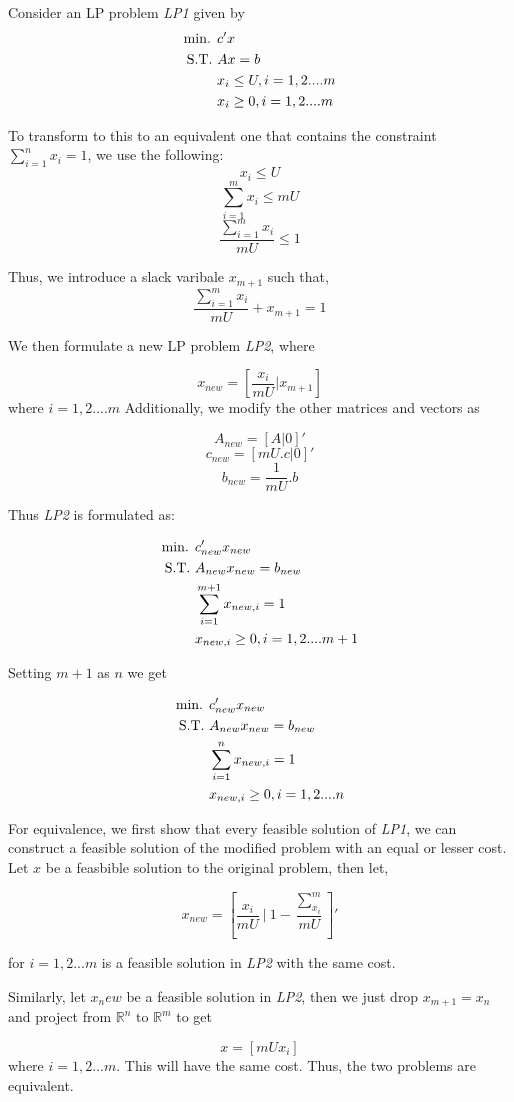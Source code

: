 Consider an LP problem \textit{LP1} given by
\begin{align}
    \text{min. } &c'x \notag\\
    \text{S.T. } &Ax = b \notag\\
    &x_i \le U, i = 1,2....m \notag\\
    &x_i \ge 0, i = 1,2....m \notag\\
\end{align}

To transform to this to an equivalent one that contains the constraint $\sum_{i=1}^{n}x_i = 1$, we use the following: 
\[ x_i \le U\]
\[ \sum_{i=1}^{m}x_i \le mU \]
\[ \frac{\sum_{i=1}^{m}x_i}{mU} \le 1\]

Thus, we introduce a slack varibale $x_{m+1}$ such that, 
\[ \frac{\sum_{i=1}^{m}x_i}{mU} + x_{m+1} = 1\]

We then formulate a new LP problem \textit{LP2}, where

\[ x_{new} = [\frac{x_i}{mU} | x_{m+1}]\]
where $i=1,2....m$
Additionally, we modify the other matrices and vectors as 

\[ A_{new} = [A | 0]'\]
\[ c_{new} = [mU.c | 0]'\]
\[ b_{new} = \frac{1}{mU}.b\]

Thus \textit{LP2} is formulated as:


\begin{align}
    \text{min. } &c_{new}'x_{new} \notag\\
    \text{S.T. } &A_{new}x_{new} = b_{new} \notag\\
    &\sum_{i=1}^{m+1}x_{new,i} = 1 \notag \\
    &x_{new,i} \ge 0, i = 1,2....m+1 \notag\\
\end{align}

Setting $m+1$ as $n$ we get

\begin{align}
    \text{min. } &c_{new}'x_{new} \notag\\
    \text{S.T. } &A_{new}x_{new} = b_{new} \notag\\
    &\sum_{i=1}^{n}x_{new,i} = 1 \notag \\
    &x_{new,i} \ge 0, i = 1,2....n \notag\\
\end{align}


For equivalence, we first show that every feasible solution of \textit{LP1}, we can construct a feasible solution of the modified problem with an equal or lesser cost. \\

Let $x$ be a feasbible solution to the original problem, then let,

\[x_{new} = \left[\frac{x_i}{mU} \:|\: 1 - \frac{\sum_{x_i}^{m}}{mU}\right]'\]

for $i=1,2...m$ is a feasible solution in \textit{LP2} with the same cost.

Similarly, let $x_new$ be a feasible solution in \textit{LP2}, then we just drop $x_{m+1} = x_{n}$ and project from $\mathbb{R}^n \text{ to } \mathbb{R}^m$ to get

\[ x = [mUx_i]\]
where $i=1,2...m$. This will have the same cost. Thus, the two problems are equivalent.